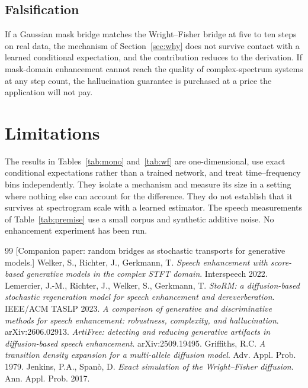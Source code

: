 \documentclass[11pt,a4paper]{article}
\begin{document}
\subsection{Falsification}

If a Gaussian mask bridge matches the Wright--Fisher bridge at five to ten steps
on real data, the mechanism of Section~\ref{sec:why} does not survive contact
with a learned conditional expectation, and the contribution reduces to the
derivation. If mask-domain enhancement cannot reach the quality of
complex-spectrum systems at any step count, the hallucination guarantee is
purchased at a price the application will not pay.

\section{Limitations}

The results in Tables~\ref{tab:mono} and~\ref{tab:wf} are one-dimensional, use
exact conditional expectations rather than a trained network, and treat
time--frequency bins independently. They isolate a mechanism and measure its size in a setting where nothing else
can account for the difference. They do not establish that it survives at
spectrogram scale with a learned estimator. The speech
measurements of Table~\ref{tab:premise} use a small corpus and synthetic
additive noise. No enhancement experiment has been run.

\begin{thebibliography}{99}
 [Companion paper: random bridges as stochastic transports for generative models.]
 Welker, S., Richter, J., Gerkmann, T.
\emph{Speech enhancement with score-based generative models in the complex STFT domain}. Interspeech 2022.
 Lemercier, J.-M., Richter, J., Welker, S., Gerkmann, T.
\emph{StoRM: a diffusion-based stochastic regeneration model for speech enhancement and dereverberation}. IEEE/ACM TASLP 2023.
 \emph{A comparison of generative and discriminative methods for speech enhancement: robustness, complexity, and hallucination}. arXiv:2606.02913.
 \emph{ArtiFree: detecting and reducing generative artifacts in diffusion-based speech enhancement}. arXiv:2509.19495.
 Griffiths, R.C. \emph{A transition density expansion for a multi-allele diffusion model}. Adv. Appl. Prob. 1979.
 Jenkins, P.A., Span\`o, D. \emph{Exact simulation of the Wright--Fisher diffusion}. Ann. Appl. Prob. 2017.
\end{thebibliography}
\end{document}
